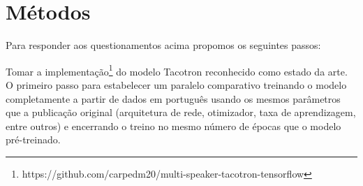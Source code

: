 \documentclass{article}
\begin{document}

\section{Métodos}
Para responder aos questionamentos acima propomos os seguintes passos:

Tomar a implementação\footnote{https://github.com/carpedm20/multi-speaker-tacotron-tensorflow} do modelo Tacotron \cite{tacotron2:DBLP:journals/corr/abs-1712-05884} reconhecido como estado da arte. O primeiro passo para estabelecer um paralelo comparativo treinando o modelo completamente a partir de dados em português usando os mesmos parâmetros que a publicação original (arquitetura de rede, otimizador, taxa de aprendizagem, entre outros) e encerrando o treino no mesmo número de épocas que o modelo pré-treinado.
\end{document}
